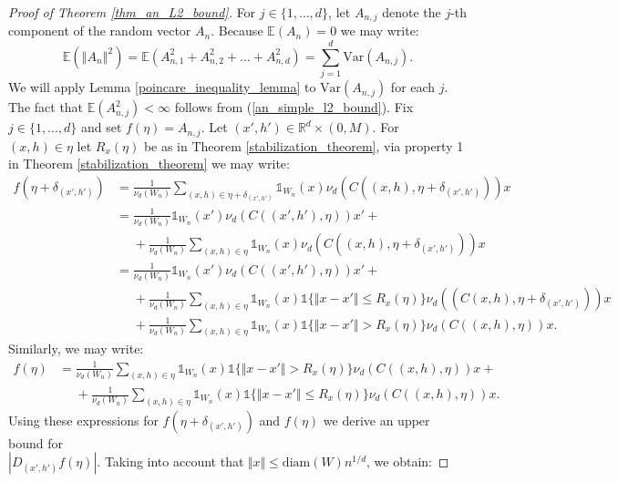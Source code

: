 \documentclass{article}
\newcommand{\RR}{\mathbb{R}}
\newcommand{\EE}{\mathbb{E}}
\theoremstyle{plain}
\theoremstyle{remark}
\theoremstyle{definition}
\begin{document}
\begin{proof}[Proof of Theorem \ref{thm_an_L2_bound}]
    For $j \in \{1,\dots,d\}$, let $A_{n,j}$ denote the $j$-th component of the random vector $A_n$. Because $\EE(A_n) = 0$ we may write:
    \begin{equation}
        \EE\left( \left\Vert A_n \right\Vert^2 \right) = \EE\left(A_{n,1}^2 + A_{n,2}^2 + \dots + A_{n,d}^2\right) = \sum_{j=1}^d \mathrm{Var}(A_{n,j}).\label{sum_squared_an}
    \end{equation}
    We will apply Lemma \ref{poincare_inequality_lemma} to $\mathrm{Var}(A_{n,j})$ for each $j$. The fact that $\EE(A_{n,j}^2) < \infty$ follows from (\ref{an_simple_l2_bound}). Fix $j \in \{1,\dots,d\}$ and set $f(\eta)=A_{n,j}$. Let $(x',h') \in \RR^d \times(0,M)$. For $(x,h)\in \eta$ let $R_x(\eta)$ be as in Theorem \ref{stabilization_theorem}, via property 1 in Theorem \ref{stabilization_theorem} we may write:
    \begin{align*}
        f(\eta+\delta_{(x',h')}) &=\frac{1}{\nu_d(W_n)}\sum_{(x,h) \in \eta+\delta_{(x',h')}}\mathds{1}_{W_n}(x)\nu_d(C((x,h),\eta+\delta_{(x',h')}))x \\
        &= \frac{1}{\nu_d(W_n)}\mathds{1}_{W_n}(x')\nu_d(C((x',h'),\eta))x' + \\
        &\phantom{=} +\frac{1}{\nu_d(W_n)}\sum_{(x,h) \in \eta}\mathds{1}_{W_n}(x)\nu_d(C((x,h),\eta+\delta_{(x',h')}))x \\
        &= \frac{1}{\nu_d(W_n)}\mathds{1}_{W_n}(x')\nu_d(C((x',h'),\eta))x' + \\
        &\phantom{=} +\frac{1}{\nu_d(W_n)}\sum_{(x,h) \in \eta}\mathds{1}_{W_n}(x)\mathds{1}\{\Vert x - x'\Vert \leq R_x(\eta)\}\nu_d((C(x,h),\eta+\delta_{(x',h')}))x \\
        &\phantom{=} +\frac{1}{\nu_d(W_n)}\sum_{(x,h) \in \eta}\mathds{1}_{W_n}(x)\mathds{1}\{\Vert x - x'\Vert > R_x(\eta)\}\nu_d(C((x,h),\eta))x.
    \end{align*}
    Similarly, we may write:
    \begin{align*}
        f(\eta) &= \frac{1}{\nu_d(W_n)}\sum_{(x,h) \in \eta}\mathds{1}_{W_n}(x)\mathds{1}\{\Vert x - x'\Vert > R_x(\eta)\}\nu_d(C((x,h),\eta))x + \\
        &\phantom{=} + \frac{1}{\nu_d(W_n)}\sum_{(x,h) \in \eta}\mathds{1}_{W_n}(x)\mathds{1}\{\Vert x - x'\Vert \leq R_x(\eta)\}\nu_d(C((x,h),\eta))x.
    \end{align*}
    Using these expressions for $f(\eta+\delta_{(x',h')})$ and $f(\eta)$ we derive an upper bound for\\ $|D_{(x',h')}f(\eta)|$. Taking into account that $\Vert x\Vert \leq \mathrm{diam}(W)n^{1/d}$, we obtain:

\end{proof}
\end{document}
